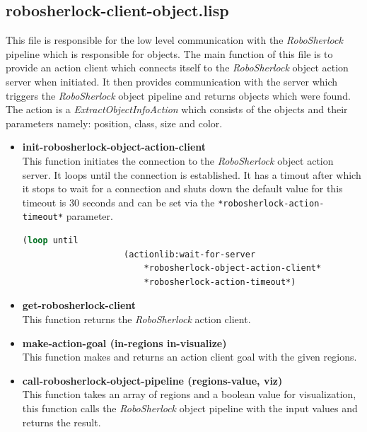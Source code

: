 \documentclass[main.tex]{subfiles}
\begin{document}
        \subsection{robosherlock-client-object.lisp}
        \label{object-perceive}
        This file is responsible for the low level communication with the \textit{RoboSherlock} pipeline which is responsible for objects. The main function of this file is to provide an action client which connects itself to the \textit{RoboSherlock} object action server when initiated. It then provides communication with the server which triggers the \textit{RoboSherlock} object pipeline and returns objects which were found. The action is a \textit{ExtractObjectInfoAction} which consists of the objects and their parameters namely: position, class, size and color.
        \begin{itemize}
            \item \textbf{init-robosherlock-object-action-client} \\
            This function initiates the connection to the \textit{RoboSherlock} object action server. It loops until the connection is established. It has a timout after which it stops to wait for a connection and shuts down the default value for this timeout is 30 seconds and can be set via the \texttt{*robosherlock-action-timeout*} parameter.
            \begin{lstlisting}[language=lisp]
                (loop until 
                    (actionlib:wait-for-server 
                        *robosherlock-object-action-client*
                        *robosherlock-action-timeout*)
            \end{lstlisting}
            \item \textbf{get-robosherlock-client} \\
            This function returns the \textit{RoboSherlock} action client.
            \item \textbf{make-action-goal (in-regions in-visualize)} \\
            This function makes and returns an action client goal with the given regions.
            \item \textbf{call-robosherlock-object-pipeline (regions-value, viz)} \\
            This function takes an array of regions and a boolean value for visualization, this function calls the \textit{RoboSherlock} object pipeline with the input values and returns the result.
        \end{itemize}
\end{document}

